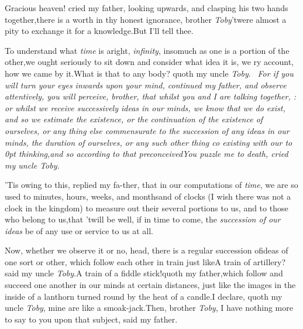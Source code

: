 \documentclass{article}
\begin{document}
Gracious heaven! cried my father, looking upwards, and clasping
his two hands together,\tsk there is a worth in thy honest
ignorance, brother \textit{Toby}\tsk ’twere almost a pity to
exchange it for a know\-ledge.\tsh But I’ll tell
thee.\tsh{}

To understand what \textit{time} is aright,\break
{}\break
\textit{infinity}, insomuch as one is a
portion of the other,\tsk we ought seriously to sit down and
consider what idea it is, we\break
{}\break
ry account, how we came by it.\tsk What is that
to any body? quoth my uncle \textit{Toby}.\break
\bgroup\itshape
\fnast\ For if you will turn your eyes inwards\break
upon your mind, {\upshape continued my father}, and\break
observe attentively, you will perceive, bro\-ther, 
that whilst you and I are talking together,
:\break
or whilst we receive successively ideas in our
minds, we know that we do exist, and so we
estimate the existence, or the continuation of
the existence of ourselves, or any thing else
commensurate to the succession of any ideas 
in our minds, the duration of ourselves, or 
any such other thing co existing with
our\egroup\break
\vbox to 0pt{\vskip-8pt
\vss}
\clearpage
\noindent
\textit{thinking,\tsh and so
according to that preconceived}\tsh You puzzle me to death,
cried my uncle \textit{Toby}.\tsk


\tsk ’Tis owing to this, replied my fa-\break ther, that
in our computations of \textit{time}, we are so used to minutes, hours,
weeks, and months\tsh and of clocks (I wish there was not
a clock in the kingdom) to measure out their several portions to
us, and to those who belong to us,\tsh that ’twill be
well, if in time to come, the \textit{succession of our ideas} be of
any use or service to us at all.

Now, whether we observe it or no,  head, there is a regular succession of\break ideas of
one sort or other, which follow each other in train just
like\tsh A train of artillery? said my uncle
\textit{Toby}.\tsk A train of a fiddle stick!\tsk quoth my
father,\tsk which follow and succeed one another in our minds at certain distances, just
like the images in the inside of a lanthorn turned round by the
heat of a candle.\tsk I declare, quoth my uncle \textit{Toby}, mine
are like a smoak-jack.\tsh Then, bro\-ther \textit{Toby},
I have nothing more to say to you upon that subject, said my
father.
\end{document}
